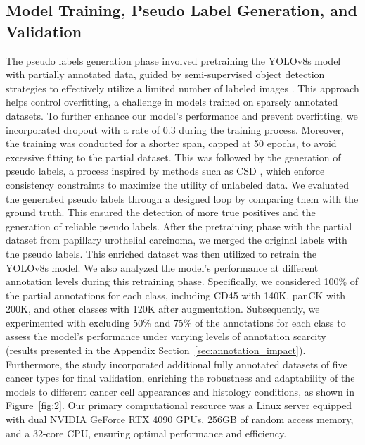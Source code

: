 \documentclass{midl} %
\begin{document}
\subsection{Model Training, Pseudo Label Generation, and Validation}
The pseudo labels generation phase involved pretraining the YOLOv8s model with partially annotated data, guided by semi-supervised object detection strategies to effectively utilize a limited number of labeled images \cite{gao2019note, jeong2019consistency}. This approach helps control overfitting, a challenge in models trained on sparsely annotated datasets. To further enhance our model's performance and prevent overfitting, we incorporated dropout with a rate of 0.3 during the training process. Moreover, the training was conducted for a shorter span, capped at 50 epochs, to avoid excessive fitting to the partial dataset. This was followed by the generation of pseudo labels, a process inspired by methods such as CSD \cite{jeong2019consistency}, which enforce consistency constraints to maximize the utility of unlabeled data. We evaluated the generated pseudo labels through a designed loop by comparing them with the ground truth. This ensured the detection of more true positives and the generation of reliable pseudo labels. After the pretraining phase with the partial dataset from papillary urothelial carcinoma, we merged the original labels with the pseudo labels. This enriched dataset was then utilized to retrain the YOLOv8s model. We also analyzed the model's performance at different annotation levels during this retraining phase. Specifically, we considered 100\% of the partial annotations for each class, including CD45 with 140K, panCK with 200K, and other classes with 120K after augmentation. Subsequently, we experimented with excluding 50\% and 75\% of the annotations for each class to assess the model's performance under varying levels of annotation scarcity (results presented in the Appendix Section~\ref{sec:annotation_impact}). Furthermore, the study incorporated additional fully annotated datasets of five cancer types for final validation, enriching the robustness and adaptability of the models to different cancer cell appearances and histology conditions, as shown in Figure~\ref{fig:2}. Our primary computational resource was a Linux server equipped with dual NVIDIA GeForce RTX 4090 GPUs, 256GB of random access memory, and a 32-core CPU, ensuring optimal performance and efficiency.
\end{document}
